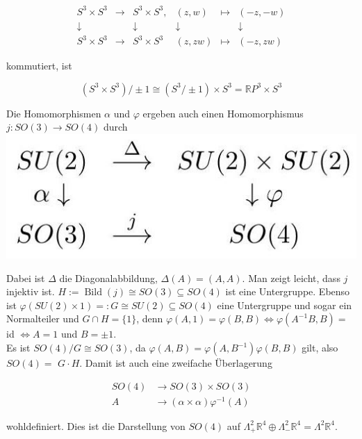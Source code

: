 \documentclass[10pt, letterpaper]{article}
\begin{document}
$$
\begin{array}{cccccc}
S^{3} \times S^{3} & \rightarrow & S^{3} \times S^{3}, & (z, w) & \mapsto & (-z,-w) \\
\downarrow & & \downarrow & \downarrow & & \downarrow \\
S^{3} \times S^{3} & \rightarrow & S^{3} \times S^{3} & (z, z w) & \mapsto & (-z, z w)
\end{array}
$$

kommutiert, ist

$$
\left(S^{3} \times S^{3}\right) / \pm 1 \cong\left(S^{3} / \pm 1\right) \times S^{3}=\mathbb{R} P^{3} \times S^{3}
$$

Die Homomorphismen $\alpha$ und $\varphi$ ergeben auch einen Homomorphismus $j: S O(3) \rightarrow S O(4)$ durch\\
\includegraphics[max width=\textwidth, center]{2025_05_20_67e75debbfd3ba8ea587g-34}

Dabei ist $\Delta$ die Diagonalabbildung, $\Delta(A)=(A, A)$. Man zeigt leicht, dass $j$ injektiv ist. $H:=\operatorname{Bild}(j) \cong S O(3) \subseteq S O(4)$ ist eine Untergruppe. Ebenso ist $\varphi(S U(2) \times 1)=: G \cong S U(2) \subseteq S O(4)$ eine Untergruppe und sogar ein Normalteiler und $G \cap H=\{1\}$, denn $\varphi(A, 1)=\varphi(B, B) \Leftrightarrow \varphi\left(A^{-1} B, B\right)=$ id $\Leftrightarrow A=1$ und $B= \pm 1$.\\
Es ist $S O(4) / G \cong S O(3)$, da $\varphi(A, B)=\varphi\left(A, B^{-1}\right) \varphi(B, B)$ gilt, also $S O(4)=$ $G \cdot H$. Damit ist auch eine zweifache Überlagerung

$$
\begin{aligned}
S O(4) & \rightarrow S O(3) \times S O(3) \\
A & \rightarrow(\alpha \times \alpha) \varphi^{-1}(A)
\end{aligned}
$$

wohldefiniert. Dies ist die Darstellung von $S O(4)$ auf $\Lambda_{+}^{2} \mathbb{R}^{4} \oplus \Lambda_{-}^{2} \mathbb{R}^{4}=\Lambda^{2} \mathbb{R}^{4}$.
\end{document}

